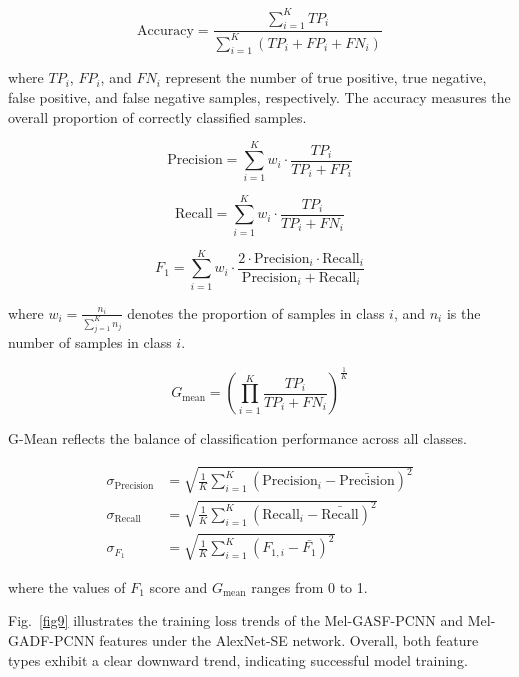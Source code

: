 \documentclass[final,5p,times,twocolumn]{elsarticle}
\begin{document}
\begin{equation}
	\text{Accuracy} = \frac{\sum_{i=1}^{K} TP_i}{\sum_{i=1}^{K} (TP_i + FP_i + FN_i)}
\end{equation}

where \(TP_i\), \(FP_i\), and \(FN_i\) represent the number of true positive, true negative, false positive, and false negative samples, respectively. The accuracy measures the overall proportion of correctly classified samples.

\begin{equation}
	\text{Precision} = \sum_{i=1}^{K} w_i \cdot \frac{TP_i}{TP_i + FP_i}
\end{equation}

\begin{equation}
	\text{Recall} = \sum_{i=1}^{K} w_i \cdot \frac{TP_i}{TP_i + FN_i}
\end{equation}

\begin{equation}
	F_1 = \sum_{i=1}^{K} w_i \cdot \frac{2 \cdot \text{Precision}_i \cdot \text{Recall}_i}{\text{Precision}_i + \text{Recall}_i}
\end{equation}

where \( w_i = \frac{n_i}{\sum_{j=1}^{K} n_j} \) denotes the proportion of samples in class \( i \), and \(n_i\) is the number of samples in class \(i\).

\begin{equation}
	G_{\text{mean}} = \left( \prod_{i=1}^{K} \frac{TP_i}{TP_i + FN_i} \right)^{\frac{1}{K}}
\end{equation}

G-Mean reflects the balance of classification performance across all classes.

\begin{align}
	\sigma_{\text{Precision}} &= \sqrt{ \frac{1}{K} \sum_{i=1}^{K} \left( \text{Precision}_i - \bar{\text{Precision}} \right)^2 } \\
	\sigma_{\text{Recall}} &= \sqrt{ \frac{1}{K} \sum_{i=1}^{K} \left( \text{Recall}_i - \bar{\text{Recall}} \right)^2 } \\
	\sigma_{F_1} &= \sqrt{ \frac{1}{K} \sum_{i=1}^{K} \left( F_{1,i} - \bar{F_1} \right)^2 }
\end{align}

where the values of \(F_1\) score and \(G_{\text{mean}}\) ranges from 0 to 1. 


Fig.~\ref{fig9} illustrates the training loss trends of the Mel-GASF-PCNN and Mel-GADF-PCNN features under the AlexNet-SE network. Overall, both feature types exhibit a clear downward trend, indicating successful model training. 
\end{document}
